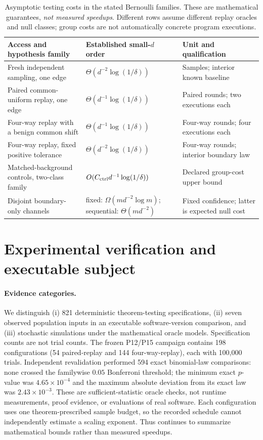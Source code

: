 \begin{table}[t]
\centering
\caption{Asymptotic testing costs in the stated Bernoulli families. These are mathematical guarantees, \emph{not measured speedups}. Different rows assume different replay oracles and null classes; group costs are not automatically concrete program executions.}
\label{tab:theory-regimes}
\normalsize
\setlength{\tabcolsep}{5pt}
\begin{tabularx}{\textwidth}{@{}p{}p{}X@{}}
\toprule
Access and hypothesis family & Established small-$d$ order & Unit and qualification\\
\midrule
Fresh independent sampling, one edge & $\Theta(d^{-2}\log(1/\delta))$ & Samples; interior known baseline\\
Paired common-uniform replay, one edge & $\Theta(d^{-1}\log(1/\delta))$ & Paired rounds; two executions each\\
Four-way replay with a benign common shift & $\Theta(d^{-1}\log(1/\delta))$ & Four-way rounds; four executions each\\
Four-way replay, fixed positive tolerance & $\Theta(d^{-2}\log(1/\delta))$ & Four-way rounds; interior boundary law\\
Matched-background controls, two-class family & $O(C_{\rm ctrl}d^{-1}\log(1/\delta))$ & Declared group-cost upper bound\\
Disjoint boundary-only channels & fixed: $\Omega(md^{-2}\log m)$; sequential: $\Theta(md^{-2})$ & Fixed confidence; latter is expected null cost\\
\bottomrule
\end{tabularx}
\end{table}

\section{Experimental verification and executable subject}
\paragraph{Evidence categories.} We distinguish (i) 821 deterministic theorem-testing specifications, (ii) seven observed population inputs in an executable software-version comparison, and (iii) stochastic simulations under the mathematical oracle models. Specification counts are not trial counts. The frozen P12/P15 campaign contains 198 configurations (54 paired-replay and 144 four-way-replay), each with 100,000 trials. Independent revalidation performed 594 exact binomial-law comparisons: none crossed the familywise $0.05$ Bonferroni threshold; the minimum exact $p$-value was $4.65\times10^{-4}$ and the maximum absolute deviation from its exact law was $2.43\times10^{-3}$. These are sufficient-statistic oracle checks, not runtime measurements, proof evidence, or evaluations of real software. Each configuration uses one theorem-prescribed sample budget, so the recorded schedule cannot independently estimate a scaling exponent. Thus  continues to summarize mathematical bounds rather than measured speedups.

